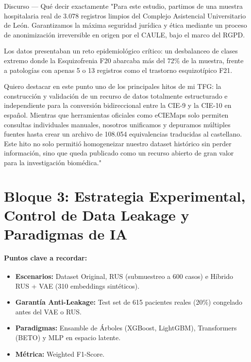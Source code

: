 \documentclass[11pt, a4paper]{article}
\newcommand{\timebadge}[2]{%
  \tcbox[
    on line,
    colback=timeBadge,
    colframe=speechBorder,
    arc=2mm,
    boxrule=0.5pt,
    top=1mm, bottom=1mm, left=2mm, right=2mm
  ]{\small \faClock\ \textbf{#1} \quad \textcolor{gray}{(#2)}}%
}
\begin{document}
\begin{speechbox}{Discurso — Qué decir exactamente}
"Para este estudio, partimos de una muestra hospitalaria real de 3.078 registros limpios del Complejo Asistencial Universitario de León. Garantizamos la máxima seguridad jurídica y ética mediante un proceso de anonimización irreversible en origen por el CAULE, bajo el marco del RGPD.

Los datos presentaban un reto epidemiológico crítico: un desbalanceo de clases extremo donde la Esquizofrenia F20 abarcaba más del 72\% de la muestra, frente a patologías con apenas 5 o 13 registros como el trastorno esquizotípico F21.

Quiero destacar en este punto uno de los principales hitos de mi TFG: la construcción y validación de un recurso de datos totalmente estructurado e independiente para la conversión bidireccional entre la CIE-9 y la CIE-10 en español. Mientras que herramientas oficiales como eCIEMaps solo permiten consultas individuales manuales, nosotros unificamos y depuramos múltiples fuentes hasta crear un archivo de 108.054 equivalencias traducidas al castellano. Este hito no solo permitió homogeneizar nuestro dataset histórico sin perder información, sino que queda publicado como un recurso abierto de gran valor para la investigación biomédica."
\end{speechbox}
\clearpage
\section{Bloque 3: Estrategia Experimental, Control de Data Leakage y Paradigmas de IA}
\timebadge{1 min 30 s}{Minuto 3:00 - 4:30}

\paragraph{Puntos clave a recordar:}
\begin{itemize}[noitemsep]
    \item \textbf{Escenarios:} Dataset Original, RUS (submuestreo a 600 casos) e Híbrido RUS + VAE (310 embeddings sintéticos).
    \item \textbf{Garantía Anti-Leakage:} Test set de 615 pacientes reales (20\%) congelado antes del VAE o RUS.
    \item \textbf{Paradigmas:} Ensamble de Árboles (XGBoost, LightGBM), Transformers (BETO) y MLP en espacio latente.
    \item \textbf{Métrica:} Weighted F1-Score.
\end{itemize}
\end{document}
